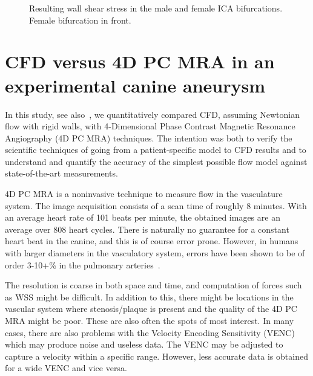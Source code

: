 \begin{figure}
  \begin{center}
    \caption{Resulting wall shear stress in the male and female ICA
      bifurcations. Female bifurcation in front.}
    \label{fig:ica_wss_res}
  \end{center}
\end{figure}

\section{CFD versus 4D PC MRA in an experimental canine aneurysm} \label{dog_study}

In this study, see also~\cite{doggy}, we quantitatively compared CFD,
assuming Newtonian flow with rigid walls, with 4-Dimensional Phase
Contrast Magnetic Resonance Angiography (4D PC MRA) techniques. The
intention was both to verify the scientific techniques of going from a
patient-specific model to CFD results and to understand and quantify
the accuracy of the simplest possible flow model against
state-of-the-art measurements.

4D PC MRA is a noninvasive technique to measure flow in the
vasculature system. The image acquisition consists of a scan time of
roughly 8 minutes. With an average heart rate of 101 beats per minute,
the obtained images are an average over 808 heart cycles. There is
naturally no guarantee for a constant heart beat in the canine, and
this is of course error prone. However, in humans with larger
diameters in the vasculatory system, errors have been shown to be of
order 3-10+\% in the pulmonary arteries~\cite{JoachimLotz,EvansAJ}.

The resolution is coarse in both space and time, and computation of
forces such as WSS might be difficult. In addition to this, there
might be locations in the vascular system where stenosis/plaque is
present and the quality of the 4D PC MRA might be poor. These are
also often the spots of most interest. In many cases, there are also
problems with the Velocity Encoding Sensitivity (VENC) which may
produce noise and useless data. The VENC may be adjusted to capture a
velocity within a specific range. However, less accurate data is
obtained for a wide VENC and vice versa.

